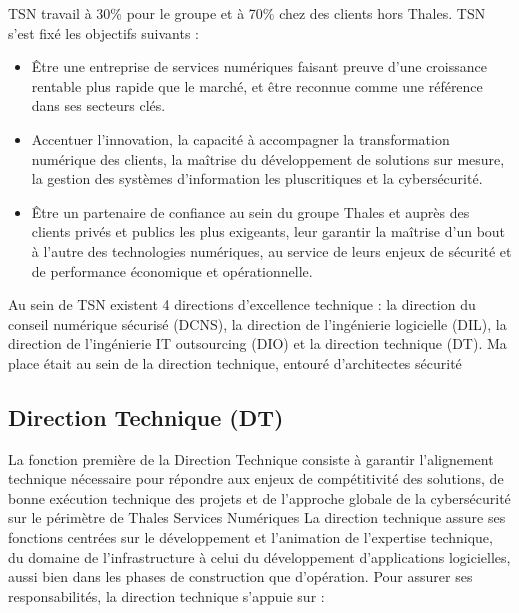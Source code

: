 \documentclass[a4paper, 12pt]{article}
\begin{document}
TSN travail à 30\% pour le groupe et à 70\% chez des clients hors Thales. TSN s’est fixé les objectifs suivants :
\begin{itemize}
	\item Être une entreprise de services numériques faisant preuve d’une croissance rentable plus rapide que le marché, et être reconnue comme une référence dans ses secteurs clés.
	\item Accentuer l’innovation, la capacité à accompagner la transformation numérique des clients, la maîtrise du développement de solutions sur mesure, la gestion des systèmes d’information les pluscritiques et la cybersécurité.
	\item Être un partenaire de confiance au sein du groupe Thales et auprès des clients privés et publics les plus exigeants, leur garantir la maîtrise d’un bout à l’autre des technologies numériques, au service de leurs enjeux de sécurité et de performance économique et opérationnelle. \\
\end{itemize}

Au sein de TSN existent 4 directions d’excellence technique : la direction du conseil numérique sécurisé (DCNS), la direction de l’ingénierie logicielle (DIL), la direction de l’ingénierie IT outsourcing (DIO) et la direction technique (DT). Ma place était au sein de la direction technique, entouré d’architectes sécurité

\subsection{Direction Technique (DT)}

La fonction première de la Direction Technique consiste à garantir l’alignement technique nécessaire pour répondre aux enjeux de compétitivité des solutions, de bonne exécution technique des projets et de l’approche globale de la cybersécurité sur le périmètre de Thales Services Numériques La direction technique assure ses fonctions centrées sur le développement et l’animation de l’expertise technique, du domaine de l’infrastructure à celui du développement d’applications logicielles, aussi bien dans les phases de construction que d’opération. Pour assurer ses responsabilités, la direction technique s’appuie sur :
\end{document}
